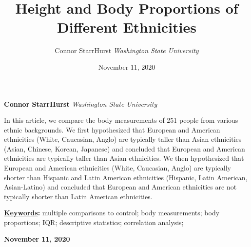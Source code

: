 \documentclass[]{article}
\title{\textbf{\textcolor{WSU.crimson}{Height and Body Proportions of Different Ethnicities}}  }
\author{\Large Connor StarrHurst\vspace{0.05in} \newline\normalsize\emph{Washington State University}  }
\date{November 11, 2020}
\newcommand*{\authorfont}{\fontfamily{phv}\selectfont}
\renewenvironment{abstract}
 {{%
    \setlength{\leftmargin}{0mm}
    \setlength{\rightmargin}{\leftmargin}%
  }%
  \relax}
 {\endlist}
\begin{document}
	
%

{%
\setlength{\parindent}{0pt}
\thispagestyle{plain}
{\fontsize{18}{20}\selectfont\raggedright 
\maketitle  %

}

{
   \vskip 13.5pt\relax \normalsize\fontsize{11}{12} 
   
\textbf{\authorfont Connor StarrHurst} \hskip 15pt \emph{\small Washington State University}   

}

}








\begin{abstract}

    \hbox{\vrule height .2pt width 39.14pc}

    \vskip 8.5pt %

\noindent In this article, we compare the body measurements of 251 people from
various ethnic backgrounds. We first hypothesized that European and
American ethnicities (White, Caucasian, Anglo) are typically taller than
Asian ethnicities (Asian, Chinese, Korean, Japanese) and concluded that
European and American ethnicities are typically taller than Asian
ethnicities. We then hypothesized that European and American ethnicities
(White, Caucasian, Anglo) are typically shorter than Hispanic and Latin
American ethnicities (Hispanic, Latin American, Asian-Latino) and
concluded that European and American ethnicities are not typically
shorter than Latin American ethnicities. \vspace{0.25in}


\vskip 8.5pt \noindent \textbf{\underline{Keywords}:} multiple comparisons to control; body measurements; body proportions;
IQR; descriptive statistics; correlation analysis; \par

    




    
    \hbox{\vrule height .2pt width 39.14pc}
    \vskip 5pt 
    \hfill \textbf{\textcolor{WSU.gray}{ November 11, 2020 } }
    \vskip 5pt 
    
\end{abstract}
\end{document}
